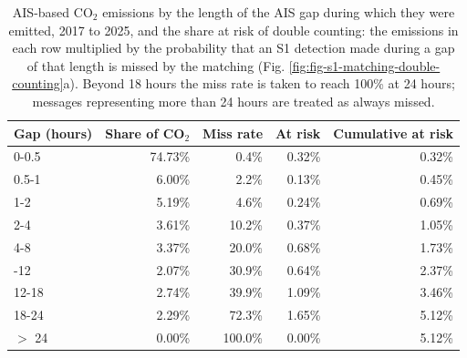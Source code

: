 \begin{table}[!h]
\centering
\caption{\label{tab:s1_matching_double_counting_by_gap}AIS-based CO$_2$ emissions by the length of the AIS gap during which they were emitted, 2017 to 2025, and the share at risk of double counting: the emissions in each row multiplied by the probability that an S1 detection made during a gap of that length is missed by the matching (Fig. \ref{fig:fig-s1-matching-double-counting}a). Beyond 18 hours the miss rate is taken to reach 100\% at 24 hours; messages representing more than 24 hours are treated as always missed.}
\centering
\fontsize{8}{10}\selectfont
\begin{tabular}[t]{lrrrr}
\toprule
Gap (hours) & Share of CO$_2$ & Miss rate & At risk & Cumulative at risk\\
\midrule
0-0.5 & 74.73\% & 0.4\% & 0.32\% & 0.32\%\\
0.5-1 & 6.00\% & 2.2\% & 0.13\% & 0.45\%\\
1-2 & 5.19\% & 4.6\% & 0.24\% & 0.69\%\\
2-4 & 3.61\% & 10.2\% & 0.37\% & 1.05\%\\
4-8 & 3.37\% & 20.0\% & 0.68\% & 1.73\%\\
\addlinespace
8-12 & 2.07\% & 30.9\% & 0.64\% & 2.37\%\\
12-18 & 2.74\% & 39.9\% & 1.09\% & 3.46\%\\
18-24 & 2.29\% & 72.3\% & 1.65\% & 5.12\%\\
$>$ 24 & 0.00\% & 100.0\% & 0.00\% & 5.12\%\\
\bottomrule
\end{tabular}
\end{table}
